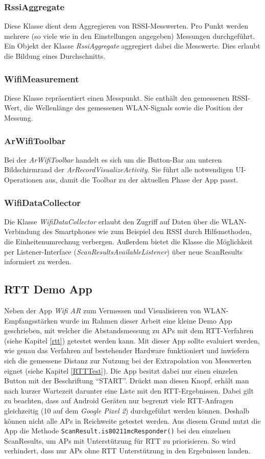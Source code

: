 \documentclass[10pt]{scrartcl}
\newcommand{\inlcode}{\texttt}
\begin{document}
\subsubsection{RssiAggregate}
Diese Klasse dient dem Aggregieren von RSSI-Messwerten. Pro Punkt werden mehrere (so viele wie in den Einstellungen angegeben) Messungen durchgeführt. Ein Objekt der Klasse \textit{RssiAggregate} aggregiert dabei die Messwerte. Dies erlaubt die Bildung eines Durchschnitts.

\subsubsection{WifiMeasurement}
Diese Klasse repräsentiert einen Messpunkt. Sie enthält den gemessenen RSSI-Wert, die Wellenlänge des gemessenen WLAN-Signals sowie die Position der Messung.

\subsubsection{ArWifiToolbar}
Bei der \textit{ArWifiToolbar} handelt es sich um die Button-Bar am unteren Bildschirmrand der \textit{ArRecordVisualizeActivity}. Sie führt alle notwendigen UI-Operationen aus, damit die Toolbar zu der aktuellen Phase der App passt.

\subsubsection{WifiDataCollector}
Die Klasse \textit{WifiDataCollector} erlaubt den Zugriff auf Daten über die WLAN-Verbindung des Smartphones wie zum Beispiel den RSSI durch Hilfsmethoden, die Einheitenumrechnug verbergen. Außerdem bietet die Klasse die Möglichkeit per Listener-Interface (\textit{ScanResultsAvailableListener}) über neue ScanResults informiert zu werden.

\subsection{RTT Demo App}
\label{rttapp}
Neben der App \textit{Wifi AR} zum Vermessen und Visualisieren von WLAN-Empfangsstärken wurde im Rahmen dieser Arbeit eine kleine Demo App geschrieben, mit welcher die Abstandsmessung zu APs mit dem RTT-Verfahren (siehe Kapitel \ref{rtt}) getestet werden kann. Mit dieser App sollte evaluiert werden, wie genau das Verfahren auf bestehender Hardware funktioniert und inwiefern sich die gemessene Distanz zur Nutzung bei der Extrapolation von Messwerten eignet (siehe Kapitel \ref{RTTTest}). Die App besitzt dabei nur einen einzelen Button mit der Beschriftung \enquote{START}. Drückt man diesen Knopf, erhält man nach kurzer Wartezeit darunter eine Liste mit den RTT-Ergebnissen. Dabei gilt zu beachten, dass auf Android Geräten nur begrenzt viele RTT-Anfragen gleichzeitig (10 auf dem \textit{Google Pixel 2}) durchgeführt werden können. Deshalb können nicht alle APs in Reichweite getestet werden. Aus diesem Grund nutzt die App die Methode \inlcode{ScanResult.is80211mcResponder()} bei den einzelnen ScanResults, um APs mit Unterstützung für RTT zu priorisieren. So wird verhindert, dass nur APs ohne RTT Unterstützung in den Ergebnissen landen.
\end{document}
